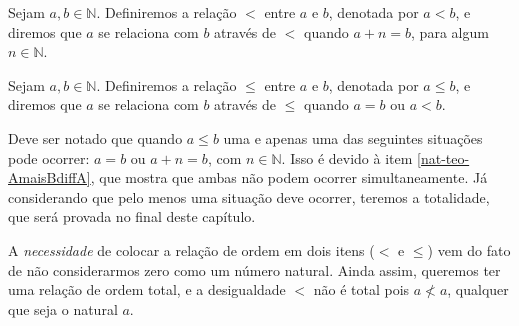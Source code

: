 \documentclass[../main.tex]{subfiles}
\begin{document}
\begin{defi}\label{nat-def-relacaoOrdem1}
Sejam $a, b \in \mathbb{N}$. Definiremos a relação $<$ entre $a$ e $b$, denotada por $a < b$, e diremos que $a$ se relaciona com $b$ através de $<$ quando $a + n = b$, para algum $n \in \mathbb{N}$. 
\end{defi}

\begin{defi}\label{nat-def-relacaoOrdem}
Sejam $a, b \in \mathbb{N}$. Definiremos a relação $\leq$ entre $a$ e $b$, denotada por $a \leq b$, e diremos que $a$ se relaciona com $b$ através de $\leq$ quando $a = b$ ou $a < b$.
\end{defi}

\begin{obs}
    Deve ser notado que quando $a \leq b$ uma e apenas uma das seguintes situações pode ocorrer: $a = b$ ou $a + n = b$, com $n \in \mathbb{N}$. Isso é devido à  item \ref{nat-teo-AmaisBdiffA}, que mostra que ambas não podem ocorrer simultaneamente. Já considerando que pelo menos uma situação deve ocorrer, teremos a totalidade, que será provada no final deste capítulo. 
\end{obs}

A \emph{necessidade} de colocar a relação de ordem em dois itens ($<$ e $\leq$) vem do fato de não considerarmos zero como um número natural. Ainda assim, queremos ter uma relação de ordem total, e a desigualdade $<$ não é total pois $a \not< a$, qualquer que seja o natural $a$.
\end{document}
